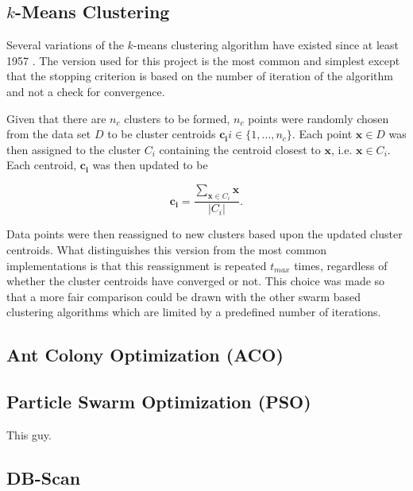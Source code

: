 \documentclass[conference]{IEEEtran}
\begin{document}
  \subsection{$k$-Means Clustering}
  Several variations of the $k$-means clustering algorithm have existed since at least 1957 \cite{steinhaus}. The version used for this project is the most common and simplest except that the stopping criterion is based on the number of iteration of the algorithm and not a check for convergence.

  Given that there are $n_c$ clusters to be formed, $n_c$ points were randomly chosen from the data set $D$ to be cluster centroids $\mathbf{c_i} i \in \{1, \ldots, n_c \} $. Each point $\mathbf{x} \in D$ was then assigned to the cluster $C_i$ containing the centroid closest to $\mathbf{x}$, i.e. $\mathbf{x} \in C_i$. Each centroid, $\mathbf{c_i}$ was then updated to be

  $$\mathbf{c_i} = \frac{\sum_{\mathbf{x} \in C_i} \mathbf{x}}{|C_i|}. $$

  Data points were then reassigned to new clusters based upon the updated cluster centroids. What distinguishes this version from the most common implementations is that this reassignment is repeated $t_{max}$ times, regardless of whether the cluster centroids have converged or not. This choice was made so that a more fair comparison could be drawn with the other swarm based clustering algorithms which are limited by a predefined number of iterations.
  

  \subsection{Ant Colony Optimization (ACO)}
  \cite{runkler}    

  \subsection{Particle Swarm Optimization (PSO)}
  This guy.\cite{merwe}

  \subsection{DB-Scan}
\end{document}

